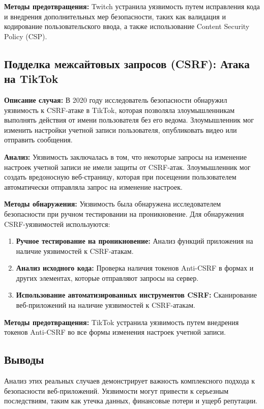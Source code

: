 \documentclass[a4paper,12pt]{diplom}
\begin{document}
	 \textbf{Методы предотвращения:} Twitch устранила уязвимость путем исправления кода и внедрения дополнительных мер безопасности, таких как валидация и кодирование пользовательского ввода, а также использование Content Security Policy (CSP).
	 
	 \subsection{Подделка межсайтовых запросов (CSRF): Атака на TikTok}
	 
	 \textbf{Описание случая:} В 2020 году исследователь безопасности обнаружил уязвимость к CSRF-атаке в TikTok, которая позволяла злоумышленникам выполнять действия от имени пользователя без его ведома.  Злоумышленник мог изменить настройки учетной записи пользователя, опубликовать видео или отправить сообщения. \cite{TikTok_attack}
	 
	 \textbf{Анализ:} Уязвимость заключалась в том, что некоторые запросы на изменение настроек учетной записи не имели  защиты от CSRF-атак.  Злоумышленник мог создать вредоносную веб-страницу, которая при посещении пользователем автоматически отправляла запрос на изменение настроек.
	 
	 \textbf{Методы обнаружения:} Уязвимость была обнаружена исследователем безопасности при ручном тестировании на проникновение. Для обнаружения CSRF-уязвимостей используются:
	 
	 \begin{enumerate}[label=\arabic{enumi})]
	 	\item \textbf{Ручное тестирование на проникновение:} Анализ функций приложения на наличие уязвимостей к CSRF-атакам.
	 	\item \textbf{Анализ исходного кода:} Проверка наличия токенов Anti-CSRF в формах и других элементах, которые отправляют запросы на сервер.
	 	\item \textbf{Использование автоматизированных инструментов CSRF:} Сканирование веб-приложений на наличие уязвимостей к CSRF-атакам. 
	 \end{enumerate}
	 
	 \textbf{Методы предотвращения:} TikTok устранила уязвимость путем внедрения токенов Anti-CSRF во все формы изменения настроек учетной записи. 
	 
	 
	 \subsection{Выводы}
	 
	 Анализ этих реальных случаев демонстрирует важность комплексного подхода к безопасности веб-приложений. Уязвимости могут привести к серьезным последствиям, таким как утечка данных, финансовые потери и ущерб репутации. 
	 
\end{document}
